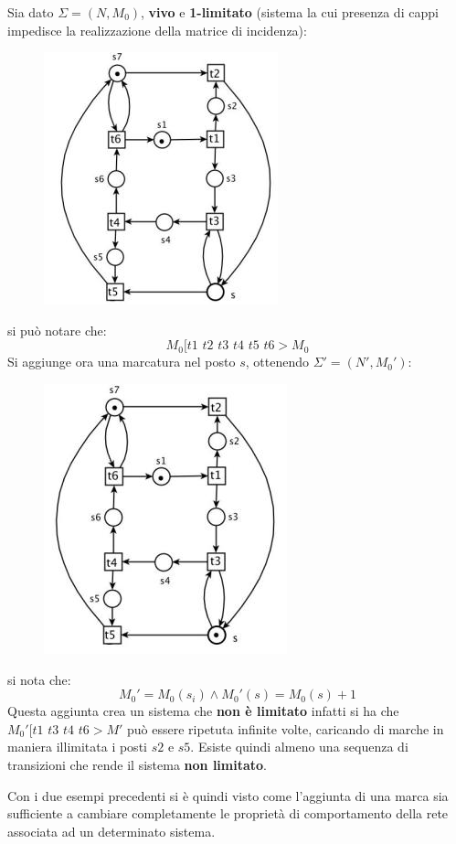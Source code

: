 \documentclass[a4paper,12pt, oneside]{book}
\begin{document}
\begin{esempio}
  Sia dato $\Sigma = (N,M_0)$, \textbf{vivo} e \textbf{1-limitato} (sistema la
  cui presenza di cappi impedisce la realizzazione della matrice di incidenza):
  \begin{figure}[H]
    \centering
    \includegraphics[scale = 0.55]{img/es5.jpg}  
  \end{figure}
  si può notare che:
  \[M_0 [t1\,\,t2\,\,t3\,\,t4\,\, t5\,\,t6 > M_0\]
  Si aggiunge ora una marcatura nel posto $s$, ottenendo $\Sigma' = (N',M_0')$: 
  \begin{figure}[H]
    \centering
    \includegraphics[scale = 0.55]{img/es6.jpg}  
  \end{figure}
  si nota che:
  \[M_0'=M_0(s_i)\land M_0'(s)=M_0(s) + 1\]
  Questa aggiunta crea un sistema che \textbf{non è limitato} infatti si ha che
  $M_0'[t1\,\, t3\,\,t4\,\, t6 > M'$ può essere ripetuta infinite volte,
  caricando di marche in maniera illimitata i posti $s2$ e $s5$. Esiste quindi
  almeno una sequenza di transizioni che rende il sistema \textbf{non limitato}.
\end{esempio}
Con i due esempi precedenti si è quindi visto come l'aggiunta di una marca sia
sufficiente a cambiare completamente le proprietà di comportamento della rete
associata ad un determinato sistema.
\end{document}
